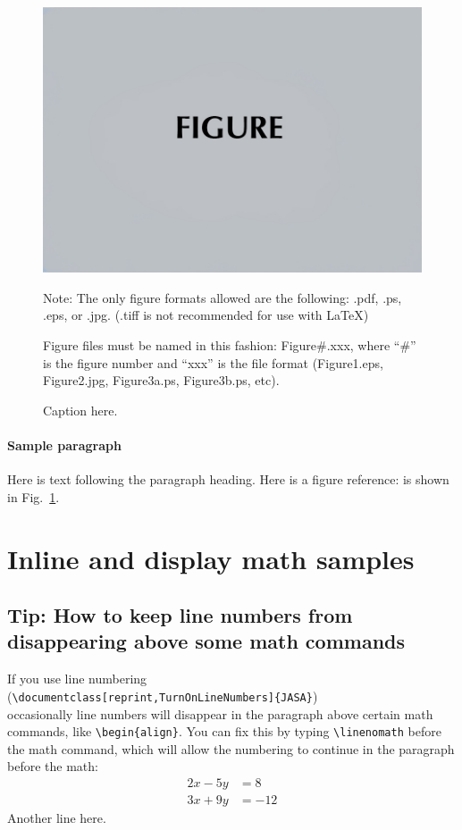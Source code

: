 \documentclass[reprint]{JASA}
\begin{document}
 
\begin{figure}
\includegraphics[width=\reprintcolumnwidth]{figsamp}
\caption{\label{fig:FIG1}{Caption here.}}
\raggedright
Note: The only figure formats allowed are the following: 
.pdf, .ps, .eps, or .jpg.  (.tiff is not recommended for use with LaTeX)

Figure files must be named in this fashion:
Figure\#.xxx, where ``\#'' is the figure number and ``xxx'' is the file format
(Figure1.eps, Figure2.jpg, Figure3a.ps, Figure3b.ps, etc). 

\end{figure}

\paragraph{Sample paragraph}Here is text following the paragraph
heading.
Here is a figure reference: is shown in Fig.~\ref{fig:FIG1}.


\section{Inline and display math samples\label{sec:3}}
\subsection{Tip: How to keep line numbers from disappearing above
some math commands} If you use line numbering \\
(\verb+\documentclass[reprint,TurnOnLineNumbers]{JASA}+)\\
occasionally line numbers will disappear in the paragraph above
certain math commands, like \verb+\begin{align}+.
You can fix this by typing \verb+\linenomath+ before the math command,
which will allow the numbering to continue in the paragraph before the
math:
\linenomath
\begin{align} 
 2x - 5y &=  8 \\ 
 3x + 9y &=  -12
\end{align}
Another line here.
\end{document}
